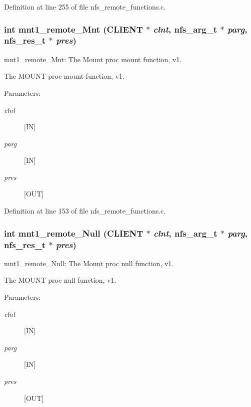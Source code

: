 Definition at line 255 of file nfs\_\-remote\_\-functions.c.
\subsubsection[{mnt1\_\-remote\_\-Mnt}]{\setlength{\rightskip}{0pt plus 5cm}int mnt1\_\-remote\_\-Mnt (CLIENT $\ast$ {\em clnt}, \/  nfs\_\-arg\_\-t $\ast$ {\em parg}, \/  nfs\_\-res\_\-t $\ast$ {\em pres})}\label{group__MNTprocs_g2cd45bf3102b89de5890480fb99db4ae}


mnt1\_\-remote\_\-Mnt: The Mount proc mount function, v1.

The MOUNT proc mount function, v1.

\begin{Desc}
\item[Parameters:]
\begin{description}
\item[{\em clnt}][IN] \item[{\em parg}][IN] \item[{\em pres}][OUT] \end{description}
\end{Desc}


Definition at line 153 of file nfs\_\-remote\_\-functions.c.
\subsubsection[{mnt1\_\-remote\_\-Null}]{\setlength{\rightskip}{0pt plus 5cm}int mnt1\_\-remote\_\-Null (CLIENT $\ast$ {\em clnt}, \/  nfs\_\-arg\_\-t $\ast$ {\em parg}, \/  nfs\_\-res\_\-t $\ast$ {\em pres})}\label{group__MNTprocs_g57af674c6a6985abc2c91f26ab22fcde}


mnt1\_\-remote\_\-Null: The Mount proc null function, v1.

The MOUNT proc null function, v1.

\begin{Desc}
\item[Parameters:]
\begin{description}
\item[{\em clnt}][IN] \item[{\em parg}][IN] \item[{\em pres}][OUT] \end{description}
\end{Desc}


